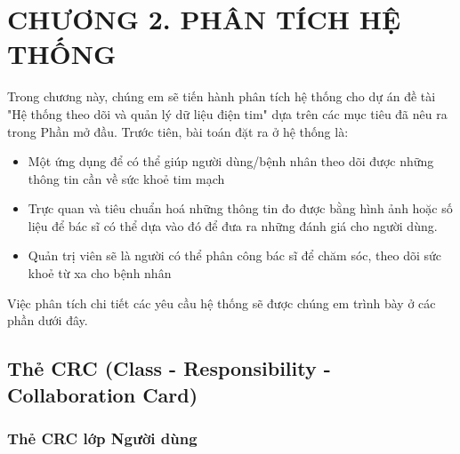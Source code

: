 
\section*{CHƯƠNG 2. PHÂN TÍCH HỆ THỐNG}
\setcounter{section}{2}
\setcounter{subsection}{0} %
\setcounter{table}{0} %
\setcounter{figure}{0} %
Trong chương này, chúng em sẽ tiến hành phân tích hệ thống cho dự án đề tài "Hệ thống theo dõi và quản lý dữ liệu điện tim" dựa trên các mục tiêu
đã nêu ra trong Phần mở đầu. Trước tiên, bài toán đặt ra ở hệ thống là:
\begin{adjustwidth}{1.5em}{}
\begin{itemize}
  \item Một ứng dụng để có thể giúp người dùng/bệnh nhân theo dõi được những thông tin cần về sức khoẻ tim mạch
  \item Trực quan và tiêu chuẩn hoá những thông tin đo được
    bằng hình ảnh hoặc số liệu để bác sĩ có thể dựa vào đó để đưa ra những đánh giá cho người dùng. 
  \item Quản trị viên sẽ là người có thể phân công bác sĩ để chăm sóc, theo dõi sức khoẻ từ
  xa cho bệnh nhân
\end{itemize}
\end{adjustwidth}
Việc phân tích chi tiết các yêu cầu hệ thống sẽ được chúng em trình bày ở các phần dưới đây.
\subsection{Thẻ CRC (Class - Responsibility - Collaboration Card)}

\subsubsection{Thẻ CRC lớp Người dùng}

